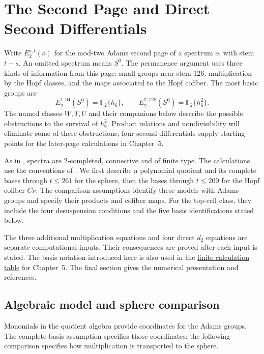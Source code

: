 \chapter{The Second Page and Direct Second Differentials}
Write $E_2^{s,t}(o)$ for the mod-two Adams second page of a spectrum
$o$, with stem $t-s$. An omitted spectrum means $S^0$.
The permanence argument uses three kinds of information from this page:
small groups near stem $126$, multiplication by the Hopf
classes, and the maps associated to the Hopf cofiber. The most
basic groups are
\[
 E_2^{1,64}(S^0)=\mathbb F_2\{h_6\},\qquad
 E_2^{2,128}(S^0)=\mathbb F_2\{h_6^2\}.
\]
The named classes $W,T,U$ and their companions below describe the
possible obstructions to the survival of $h_6^2$. Product relations and
nondivisibility will eliminate some of these obstructions; four second
differentials supply starting points for the later-page calculations in
Chapter~5.

As in \cite{LWX126}, spectra are $2$-completed, connective and of
finite type. The calculations use the conventions of \cite{LinProgram}.
We first describe a polynomial quotient and its complete bases through
$t\leq261$ for the sphere, then the bases through $t\leq200$ for the Hopf
cofiber $C\nu$. The comparison assumptions identify these models with
Adams groups and specify their products and cofiber maps. For the
top-cell class, they include the four desuspension conditions and the
five basis identifications stated below.

The three additional multiplication equations and four direct $d_2$
equations are separate computational inputs. Their consequences are
proved after each input is stated. The basis notation introduced here
is also used in the
\href{paper/finite-calculations.html}{finite calculation table}
for Chapter~5. The final section gives the numerical presentation and
references.

\section{Algebraic model and sphere comparison}

Monomials in the quotient algebra provide coordinates for the Adams
groups. The complete-basis assumption specifies those coordinates;
the following comparison specifies how multiplication is transported
to the sphere.

